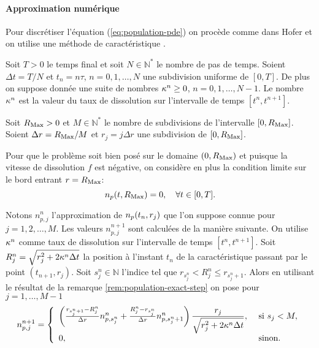 \paragraph{Approximation numérique} Pour discrétiser l'équation
(\ref{eq:population-pde}) on procède comme dans Hofer \cite{Hofer2011}
et on utilise une méthode de caractéristique \cite{Pironneau1989}.

Soit $T > 0$ le temps final et soit $N\in \mathbb N^*$ le nombre de
pas de temps. Soient $\Delta t = T/N$ et $t_n = n\tau$, $n = 0,1,
\dots, N$ une subdivision uniforme de $[0, T]$. De plus on suppose
donnée une suite de nombres $\kappa^n \geq 0$, $n = 0, 1,
\dots, N - 1$. Le nombre $\kappa^n$ est la valeur du taux de
dissolution sur l'intervalle de temps $[t^n, t^{n+1}]$.

Soit $R_\mathrm{Max} > 0$ et $M \in \mathbb N^*$ le nombre de subdivisions de
l'intervalle $[0, R_\mathrm{Max}]$. Soient $\Delta r = R_\mathrm{Max}/M$ et $r_j =
j\Delta r$ une subdivision de $[0, R_\mathrm{Max}]$.

Pour que le problème soit bien posé sur le domaine $(0,
R_\mathrm{Max})$ et puisque la vitesse de dissolution $f$ est négative, on
considère en plus la condition limite sur le bord entrant $r = R_\mathrm{Max}$:
\begin{equation*}
  n_p(t, R_\mathrm{Max}) = 0,\quad\forall t \in [0, T].
\end{equation*}

Notons $n_{p,j}^n$ l'approximation de $n_p(t_n, r_j)$ que l'on
suppose connue pour $j = 1,2, \dots, M$. Les valeurs $n_{p,j}^{n+1}$
sont calculées de la manière suivante. On utilise $\kappa^n$
comme taux de dissolution sur l'intervalle de temps $[t^n,
  t^{n+1}]$. Soit $R_j^n = \sqrt{r_j^2 + 2\kappa^n \Delta
  t}$ la position à l'instant $t_n$ de la caractéristique passant par le point
$(t_{n+1}, r_j)$. Soit $s_j^n \in \mathbb N$
l'indice tel que $r_{s_j^n} < R_j^n \leq r_{s_j^n + 1}$. Alors en
utilisant le résultat de la remarque \ref{rem:population-exact-step}
on pose pour $j = 1,\dots, M-1$
\begin{equation}\label{eq:population-characteristic-scheme}
  n_{p,j}^{n+1} = \left\{
  \begin{array}{ll}
    \left( \frac{r_{s_j^n + 1} - R_j^n}{\Delta r}
      n_{p,s_j^n}^n + \frac{R_j^n - r_{s_j^n}}{\Delta r} n_{p,s_j^n +
        1}^n \right) \displaystyle\frac{r_j}{\sqrt{r_j^2 + 2\kappa^n \Delta
        t}},&\text{ si } s_j < M,\\
    0, & \text{ sinon.}
  \end{array}
  \right.
\end{equation}


